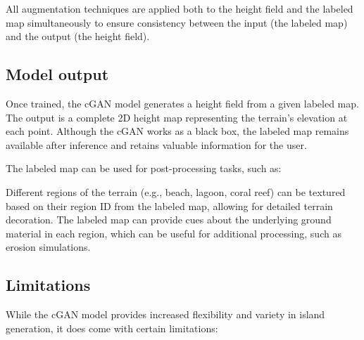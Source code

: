 All augmentation techniques are applied both to the height field and the labeled map simultaneously to ensure consistency between the input (the labeled map) and the output (the height field).

\subsection{Model output}

Once trained, the cGAN model generates a height field from a given labeled map. The output is a complete 2D height map representing the terrain's elevation at each point. Although the cGAN works as a black box, the labeled map remains available after inference and retains valuable information for the user.

The labeled map can be used for post-processing tasks, such as:
\begin{Itemize}
     Different regions of the terrain (e.g., beach, lagoon, coral reef) can be textured based on their region ID from the labeled map, allowing for detailed terrain decoration.
     The labeled map can provide cues about the underlying ground material in each region, which can be useful for additional processing, such as erosion simulations.
\end{Itemize}


\subsection{Limitations}

While the cGAN model provides increased flexibility and variety in island generation, it does come with certain limitations:


